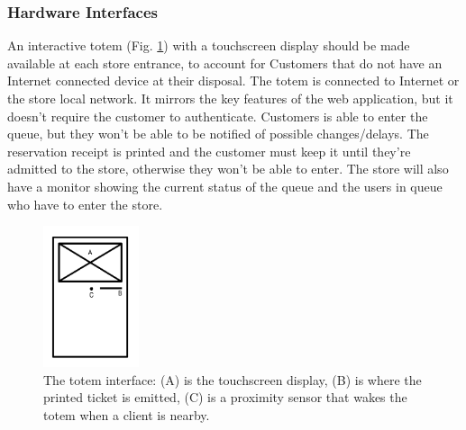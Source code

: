 \subsubsection{Hardware Interfaces}

An interactive totem (Fig. \ref{fig:totem}) with a touchscreen display should be made available at each store entrance, to account for Customers that do not have an Internet connected device at their disposal.
The totem is connected to Internet or the store local network.
It mirrors the key features of the web application, but it doesn't require the customer to
authenticate. Customers is able to enter the queue, but they won't be able to
be notified of possible changes/delays. The reservation receipt is printed and the customer must keep it until they're
admitted to the store, otherwise they won't be able to enter.
The store will also have a monitor showing the current status of the queue and the users in queue who have to enter the store.
\begin{figure}[H]
    \centering
    \includegraphics[width=0.25\textwidth]{images/totem.pdf}
    \caption{The totem interface: (A) is the touchscreen display,
    (B) is where the printed ticket is emitted, (C) is a proximity sensor that wakes the
    totem when a client is nearby.}
    \label{fig:totem}
\end{figure}

